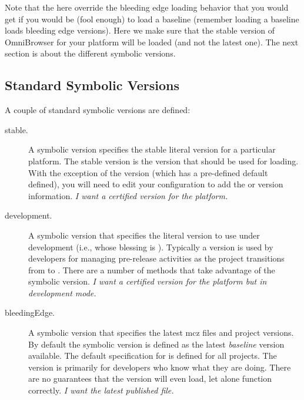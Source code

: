 \documentclass[a4paper,10pt,twoside]{book}
\begin{document}
Note that the  here override the bleeding edge loading behavior that you would get if you would be (fool enough) to load a baseline (remember loading a baseline loads bleeding edge versions). Here we make sure that the stable version of OmniBrowser for your platform will be loaded (and not the latest one). The next section is about the different symbolic versions.
    
   
    


\subsection{Standard Symbolic Versions}

A couple of standard symbolic versions are defined:

\begin{description}
\item [stable.] A symbolic version specifies the stable literal version for a particular platform. The stable version is the version that should be used for loading. With the exception of the  version (which has a pre-defined default defined), you will need to edit your configuration to add the  or  version information. \emph{I want a certified version for the platform.}

\item [development.] A symbolic version that specifies the literal version to use under development (i.e., whose blessing is ). Typically a  version is used by developers for managing pre-release activities as the project transitions from  to . There are a number of  methods that take advantage of the  symbolic version. \emph{I want a certified version for the platform but in development mode.}

\item [bleedingEdge.]  A symbolic version that specifies the latest mcz files and project versions. By default the  symbolic version is defined as the latest \emph{baseline} version available. The default specification for  is defined for all projects. The  version is primarily for developers who know what they are doing. There are no guarantees that the  version will even load, let alone function correctly. \emph{I want the latest published file.}

\end{description}
\end{document}
